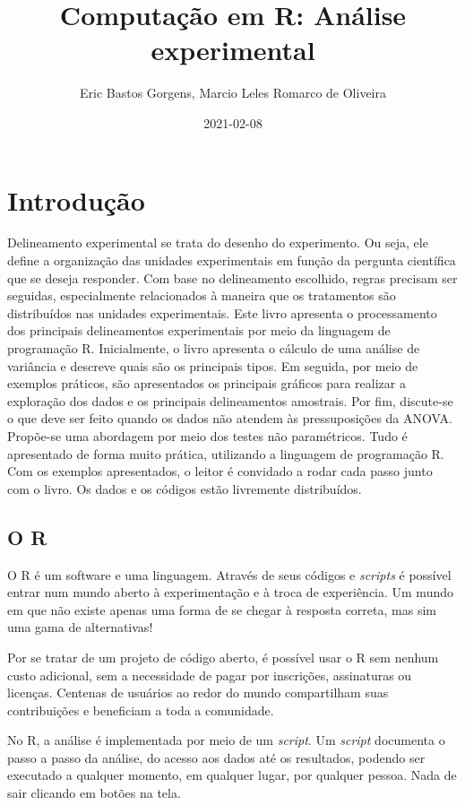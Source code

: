 \documentclass[
]{article}
\title{Computação em R: Análise experimental}
\author{Eric Bastos Gorgens, Marcio Leles Romarco de Oliveira}
\date{2021-02-08}
\begin{document}
\maketitle

{
\setcounter{tocdepth}{2}
\tableofcontents
}
\hypertarget{introduuxe7uxe3o}{%
\section{Introdução}\label{introduuxe7uxe3o}}

Delineamento experimental se trata do desenho do experimento. Ou seja, ele define a organização das unidades experimentais em função da pergunta científica que se deseja responder. Com base no delineamento escolhido, regras precisam ser seguidas, especialmente relacionados à maneira que os tratamentos são distribuídos nas unidades experimentais. Este livro apresenta o processamento dos principais delineamentos experimentais por meio da linguagem de programação R. Inicialmente, o livro apresenta o cálculo de uma análise de variância e descreve quais são os principais tipos. Em seguida, por meio de exemplos práticos, são apresentados os principais gráficos para realizar a exploração dos dados e os principais delineamentos amostrais. Por fim, discute-se o que deve ser feito quando os dados não atendem às pressuposições da ANOVA. Propõe-se uma abordagem por meio dos testes não paramétricos. Tudo é apresentado de forma muito prática, utilizando a linguagem de programação R. Com os exemplos apresentados, o leitor é convidado a rodar cada passo junto com o livro. Os dados e os códigos estão livremente distribuídos.

\hypertarget{o-r}{%
\subsection{O R}\label{o-r}}

O R é um software e uma linguagem. Através de seus códigos e \emph{scripts} é possível entrar num mundo aberto à experimentação e à troca de experiência. Um mundo em que não existe apenas uma forma de se chegar à resposta correta, mas sim uma gama de alternativas!

Por se tratar de um projeto de código aberto, é possível usar o R sem nenhum custo adicional, sem a necessidade de pagar por inscrições, assinaturas ou licenças. Centenas de usuários ao redor do mundo compartilham suas contribuições e beneficiam a toda a comunidade.

No R, a análise é implementada por meio de um \emph{script}. Um \emph{script} documenta o passo a passo da análise, do acesso aos dados até os resultados, podendo ser executado a qualquer momento, em qualquer lugar, por qualquer pessoa. Nada de sair clicando em botões na tela.
\end{document}
